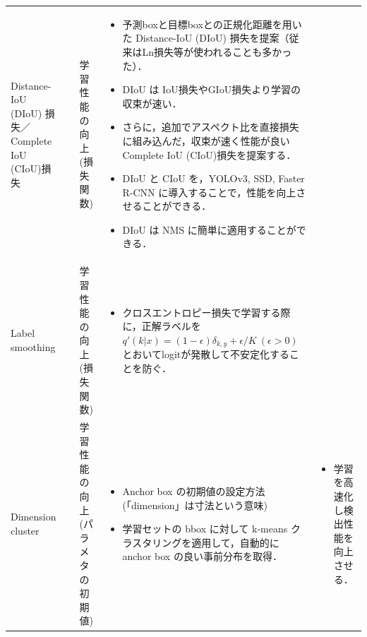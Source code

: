 \documentclass[originalpaper,fleqn]{jsaiart}     %
\begin{document}
\begin{table}
\begin{center}
\begin{tabularx}{\linewidth}{Xp{1.5cm}Xp{7cm}X}
            Distance-IoU (DIoU) 損失／Complete IoU (CIoU)損失
            & \cite{ZWLLYR20} & 学習性能の向上 (損失関数) & 
            \begin{itemize}
                \vspace{-0.7\baselineskip}
                \setlength{\leftskip}{-3mm}
                \item 予測boxと目標boxとの正規化距離を用いた Distance-IoU (DIoU) 損失を提案（従来はLn損失等が使われることも多かった）．
                \item DIoU は IoU損失やGIoU損失より学習の収束が速い．
                \item さらに，追加でアスペクト比を直接損失に組み込んだ，収束が速く性能が良い Complete IoU (CIoU)損失を提案する．
                \item DIoU と CIoU を，YOLOv3, SSD, Faster R-CNN に導入することで，性能を向上させることができる．
                \item DIoU は NMS に簡単に適用することができる．
            \end{itemize}
            &
            \\

            Label smoothing
            & \cite{SVISW16} & 学習性能の向上 (損失関数) & 
            \begin{itemize}
                \vspace{-0.7\baselineskip}
                \setlength{\leftskip}{-3mm}
                \item クロスエントロピー損失で学習する際に，正解ラベルを $q'(k|x){=}(1{-}\epsilon)\delta_{k,y}{+}\epsilon/K \ (\epsilon{>}0)$とおいてlogitが発散して不安定化することを防ぐ．
            \end{itemize}
            &
            \\

            Dimension cluster
            & \cite{RedFar17} & 学習性能の向上 (パラメタの初期値) & 
            \begin{itemize}
                \vspace{-0.7\baselineskip}
                \setlength{\leftskip}{-3mm}
                \item Anchor box の初期値の設定方法(「dimension」は寸法という意味)
                \item 学習セットの bbox に対して k-means クラスタリングを適用して，自動的に anchor box の良い事前分布を取得．
            \end{itemize}
            &
            \begin{itemize}
                \vspace{-0.7\baselineskip}
                \setlength{\leftskip}{-3mm}
                \item 学習を高速化し検出性能を向上させる．
            \end{itemize}
            \\


\end{tabularx}
\end{center}
\end{table}
\end{document}

